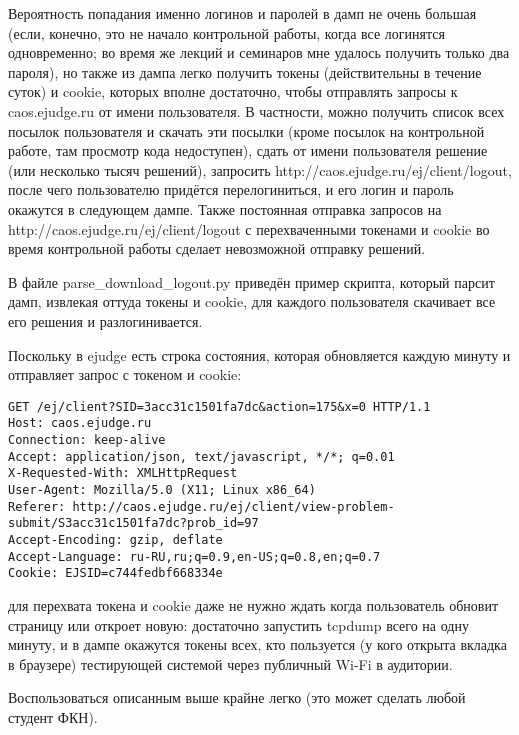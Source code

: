 \documentclass{article}
\begin{document}
Вероятность попадания именно логинов и паролей в дамп не очень большая (если, конечно, это не начало контрольной работы, когда все логинятся одновременно; во время же лекций и семинаров мне удалось получить только два пароля), но также из дампа легко получить токены (действительны в течение суток) и cookie, которых вполне достаточно, чтобы отправлять запросы к caos.ejudge.ru от имени пользователя. В частности, можно получить список всех посылок пользователя и скачать эти посылки (кроме посылок на контрольной работе, там просмотр кода недоступен), сдать от имени пользователя решение (или несколько тысяч решений), запросить http://caos.ejudge.ru/ej/client/logout, после чего пользователю придётся перелогиниться, и его логин и пароль окажутся в следующем дампе. Также постоянная отправка запросов на http://caos.ejudge.ru/ej/client/logout с перехваченными токенами и cookie во время контрольной работы сделает невозможной отправку решений.


В файле parse\_download\_logout.py приведён пример скрипта, который парсит дамп, извлекая оттуда токены и cookie, для каждого пользователя скачивает все его решения и разлогинивается.


Поскольку в ejudge есть строка состояния, которая обновляется каждую минуту и отправляет запрос с токеном и cookie:

\fontsize{8}{8}\selectfont
\begin{verbatim}
GET /ej/client?SID=3acc31c1501fa7dc&action=175&x=0 HTTP/1.1
Host: caos.ejudge.ru
Connection: keep-alive
Accept: application/json, text/javascript, */*; q=0.01
X-Requested-With: XMLHttpRequest
User-Agent: Mozilla/5.0 (X11; Linux x86_64) 
Referer: http://caos.ejudge.ru/ej/client/view-problem-submit/S3acc31c1501fa7dc?prob_id=97
Accept-Encoding: gzip, deflate
Accept-Language: ru-RU,ru;q=0.9,en-US;q=0.8,en;q=0.7
Cookie: EJSID=c744fedbf668334e
\end{verbatim}
\fontsize{10}{10}\selectfont
для перехвата токена и cookie даже не нужно ждать когда пользователь обновит страницу или откроет новую: достаточно запустить tcpdump всего на одну минуту, и в дампе окажутся токены всех, кто пользуется (у кого открыта вкладка в браузере) тестирующей системой через публичный Wi-Fi в аудитории.


Воспользоваться описанным выше крайне легко (это может сделать любой студент ФКН).
\end{document}
